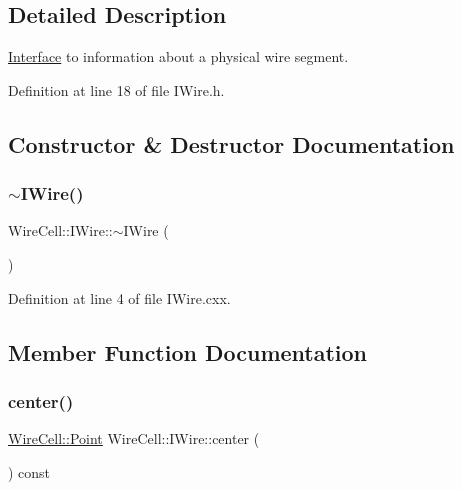 \subsection{Detailed Description}
\hyperlink{class_wire_cell_1_1_interface}{Interface} to information about a physical wire segment. 

Definition at line 18 of file I\+Wire.\+h.



\subsection{Constructor \& Destructor Documentation}
\mbox{\label{class_wire_cell_1_1_i_wire_a99180a0590802eabb706eead70d3cd65}} 
\subsubsection{\texorpdfstring{$\sim$\+I\+Wire()}{~IWire()}}
{\footnotesize\ttfamily Wire\+Cell\+::\+I\+Wire\+::$\sim$\+I\+Wire (\begin{DoxyParamCaption}{ }\end{DoxyParamCaption})\hspace{0.3cm}{\ttfamily [virtual]}}



Definition at line 4 of file I\+Wire.\+cxx.



\subsection{Member Function Documentation}
\mbox{\label{class_wire_cell_1_1_i_wire_aec6abd930c2209a7bd809b30a871d1b6}} 
\subsubsection{\texorpdfstring{center()}{center()}}
{\footnotesize\ttfamily \hyperlink{namespace_wire_cell_ab2b2565fa6432efbb4513c14c988cda9}{Wire\+Cell\+::\+Point} Wire\+Cell\+::\+I\+Wire\+::center (\begin{DoxyParamCaption}{ }\end{DoxyParamCaption}) const\hspace{0.3cm}{\ttfamily [virtual]}}




